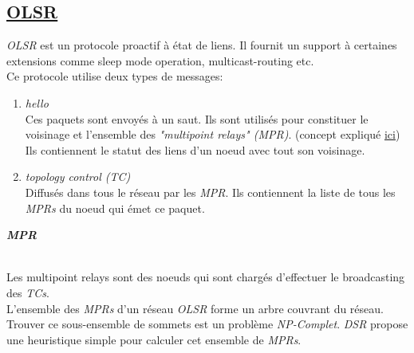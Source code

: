\subsection{\underline{OLSR}}
    \textit{OLSR} est un protocole proactif à état de liens. Il fournit un support à certaines extensions comme
    sleep mode operation, multicast-routing etc.\\
    Ce protocole utilise deux types de messages:\\
    \begin{enumerate}
        \item \textit{hello}\\
            Ces paquets sont envoyés à un saut. Ils sont utilisés pour constituer le voisinage et
            l'ensemble des \textit{"multipoint relays" (MPR)}. (concept expliqué  \hyperlink{mpr}{ici})\\
            Ils contiennent le statut des liens d'un noeud avec tout son voisinage.
        \item \textit{topology control (TC)}\\
            Diffusés dans tous le réseau par les \textit{MPR}. Ils contiennent la liste de tous les \textit{MPRs}
            du noeud qui émet ce paquet.
    \end{enumerate}
    \hypertarget{mpr}{\textit{\textbf{MPR}}}\\
    Les multipoint relays sont des noeuds qui sont chargés d'effectuer le broadcasting des \textit{TCs}. \\
    L'ensemble des \textit{MPRs} d'un réseau \textit{OLSR} forme un arbre couvrant du réseau. Trouver ce sous-ensemble de sommets
    est un problème \textit{NP-Complet}. \textit{DSR} propose une heuristique simple pour calculer cet ensemble de \textit{MPRs}.\\
    
